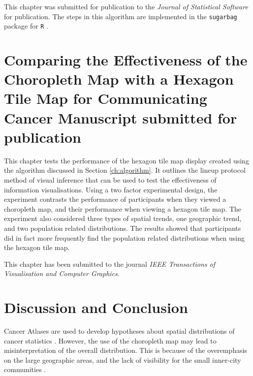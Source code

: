 \documentclass{monashthesis}
\begin{document}
This chapter was submitted for publication to the \emph{Journal of Statistical Software} for publication.
The steps in this algorithm are implemented in the \texttt{sugarbag} \autocite{sugarbag} package for \texttt{R} \autocite{R}.





\hypertarget{ch:experiment}{%
\chapter{Comparing the Effectiveness of the Choropleth Map with a Hexagon Tile Map for Communicating Cancer Manuscript submitted for publication}\label{ch:experiment}}

This chapter tests the performance of the hexagon tile map display created using the algorithm discussed in Section \ref{ch:algorithm}.
It outlines the lineup protocol method of visual inference that can be used to test the effectiveness of information visualisations.
Using a two factor experimental design, the experiment contrasts the performance of participants when they viewed a choropleth map, and their performance when viewing a hexagon tile map.
The experiment also considered three types of spatial trends, one geographic trend, and two population related distributions.
The results showed that participants did in fact more frequently find the population related distributions when using the hexagon tile map.

This chapter has been submitted to the journal \emph{IEEE Transactions of Visualisation and Computer Graphics}.





\hypertarget{ch:conclusion}{%
\chapter{Discussion and Conclusion}\label{ch:conclusion}}

Cancer Atlases are used to develop hypotheses about spatial distributions of cancer statistics \autocite{CPISACA}. However, the use of the choropleth map may lead to misinterpretation of the overall distribution. This is because of the overemphasis on the large geographic areas, and the lack of visibility for the small inner-city communities \autocite{ACTUC}.
\end{document}
